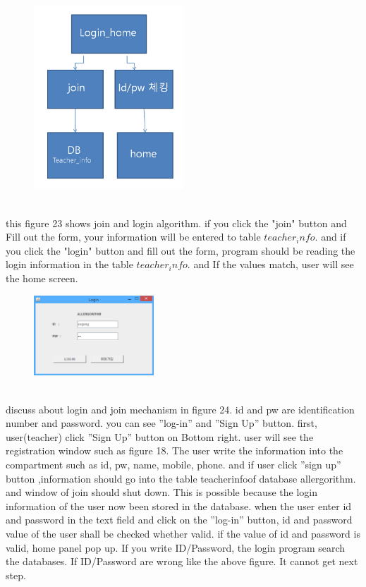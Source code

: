 \documentclass[a4paper,11pt]{IEEEtran}
\begin{document}
{{{\begin{figure}[!h]
        \centering
        \includegraphics[width=0.5\textwidth, height=0.5\textheight]{usec1.jpg}
        \caption{}
        \label{fig1}
\end{figure}
~\\
this figure 23 shows join and login algorithm. if you click the "join" button and Fill out the form, your information will be entered to table $teacher_info$. and if you click the "login" button and fill out the form, program should be reading the login information in the table $teacher_info$. and If the values match, user will see the home screen.
~\\
\begin{figure}[!h]
        \centering
        \includegraphics[width=0.4\textwidth]{usec2.jpg}
        \caption{}
        \label{fig1}
\end{figure}
~\\
discuss about login and join mechanism in figure 24. id and pw are identification number and password. you can see ”log-in” and ”Sign Up” button. first, user(teacher) click ”Sign Up” button on Bottom right. user will see the registration window such as figure 18. The user write the information into the compartment such as id, pw, name, mobile, phone. and if user click ”sign up” button ,information should go into the table teacherinfoof database allergorithm. and window of join should shut down. This is possible because the login information of the user now been stored in the database. when the user enter id and password in the text field and click on the ”log-in” button, id and password value of the user shall be checked whether valid. if the value of id and password is valid, home panel pop up. If you write ID/Password, the login program search the databases. If ID/Password are wrong like the above figure. It cannot get next step. 
}}}
\end{document}
